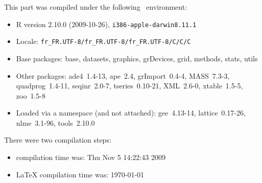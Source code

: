\documentclass{article}
\begin{document}
\begin{scriptsize}

This part was compiled under the following \Rlogo{}~environment:

\begin{itemize}\raggedright
  \item R version 2.10.0 (2009-10-26), \verb|i386-apple-darwin8.11.1|
  \item Locale: \verb|fr_FR.UTF-8/fr_FR.UTF-8/fr_FR.UTF-8/C/C/C|
  \item Base packages: base, datasets, graphics, grDevices, grid,
    methods, stats, utils
  \item Other packages: ade4~1.4-13, ape~2.4, grImport~0.4-4,
    MASS~7.3-3, quadprog~1.4-11, seqinr~2.0-7, tseries~0.10-21,
    XML~2.6-0, xtable~1.5-5, zoo~1.5-8
  \item Loaded via a namespace (and not attached): gee~4.13-14,
    lattice~0.17-26, nlme~3.1-96, tools~2.10.0
\end{itemize}
There were two compilation steps:

\begin{itemize}
  \item \Rlogo{} compilation time was: Thu Nov  5 14:22:43 2009
  \item \LaTeX{} compilation time was: \today
\end{itemize}

\end{scriptsize}


\clearpage
{}


\end{document}
